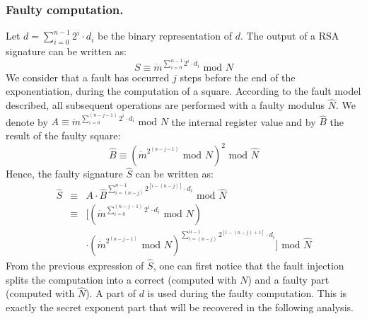 \documentclass{article}
\begin{document}
\subsubsection{Faulty computation.}
Let $d = \sum_{i=0}^{n-1} 2^{i} \cdot d_i$ be the binary representation of $d$.  The output of a RSA signature can be written as:
\begin{equation}
 S \equiv \dot{m}^{\sum_{i=0}^{n-1} 2^{i} \cdot d_i} \mbox{ mod } N
\end{equation}
We consider that a fault has occurred $j$ steps before the end of the exponentiation, during the computation of a square. According to the fault model described, all subsequent operations are performed with a faulty modulus $\hat{N}$. We denote by $A \equiv \dot{m}^{\sum_{i=0}^{(n-j-1)} 2^{i} \cdot d_i}\mbox{ mod } N$ the internal register value and by $\hat{B}$ the result of the faulty square:
\begin{equation}
 \hat{B} \equiv \left(\dot{m}^{2^{(n-j-1)}}\mbox{ mod } N\right)^2 \mbox{ mod }\hat{N} 
\end{equation}
Hence, the faulty signature $\hat{S}$ can be written as:
\begin{eqnarray}
 \hat{S} & \equiv & A \cdot \hat{B}^{\sum_{i=(n-j)}^{n-1} 2^{[i-(n-j)]} \cdot d_i} \mbox{ mod } \hat{N}\\
	 & \equiv & [(\dot{m}^{\sum_{i=0}^{(n-j-1)} 2^{i} \cdot d_i}\mbox{ mod } N)\\ \nonumber
	 &        & \cdot (\dot{m}^{2^{(n-j-1)}}\mbox{ mod } N)^{\sum_{i=(n-j)}^{n-1} 
		    2^{[i-(n-j)+1]} \cdot d_i}]\mbox{ mod } \hat{N} 
\end{eqnarray}
From the previous expression of $\hat{S}$, one can first notice that the fault injection splits the computation into a correct (computed with $N$) and a faulty part (computed with $\hat{N}$). A part of $d$ is used during the faulty computation. This is exactly the secret exponent part that will be recovered in the following analysis.
\end{document}
